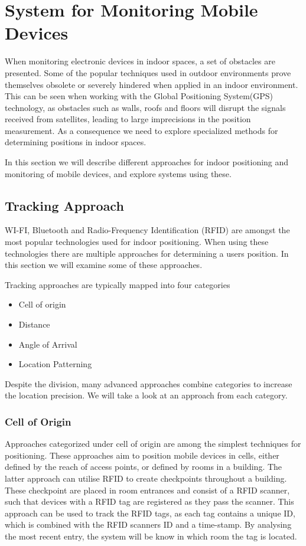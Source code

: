 \section{System for Monitoring Mobile Devices}\label{sec:monitoring}
When monitoring electronic devices in indoor spaces, a set of obstacles are presented. Some of the popular techniques used in outdoor environments prove themselves obsolete or severely hindered when applied in an indoor environment.  This can be seen when working with the Global Positioning System(GPS) technology, as obstacles such as walls, roofs and floors will disrupt the signals received from satellites, leading to large imprecisions in the position measurement. As a consequence we need to explore specialized methods for determining positions in indoor spaces.

In this section we will describe different approaches for indoor positioning and monitoring of mobile devices, and explore systems using these.

\subsection{Tracking Approach}\label{sec:tracking_approach}
WI-FI, Bluetooth and Radio-Frequency Identification (RFID) are amongst the most popular technologies used for indoor positioning. When using these technologies there are multiple approaches for determining a users position. In this section we will examine some of these approaches.

Tracking approaches are typically mapped into four categories\cite{tracking_approaches}
\begin{itemize}
\item Cell of origin
\item Distance
\item Angle of Arrival
\item Location Patterning
\end{itemize}
Despite the division, many advanced approaches combine categories to increase the location precision. We will take a look at an approach from each category.

\subsubsection*{Cell of Origin}
Approaches categorized under cell of origin are among the simplest techniques for positioning. These approaches aim to position mobile devices in cells, either defined by the reach of access points, or defined by rooms in a building.
The latter approach can utilise RFID to create checkpoints throughout a building. These checkpoint are placed in room entrances and consist of a RFID scanner, such that devices with a RFID tag are registered as they pass the scanner\cite{indoor_bin}. 
This approach can be used to track the RFID tags, as each tag contains a unique ID, which is combined with the RFID scanners ID and a time-stamp. By analysing the most recent entry, the system will be know in which room the tag is located\cite{RFIDjournal}.


